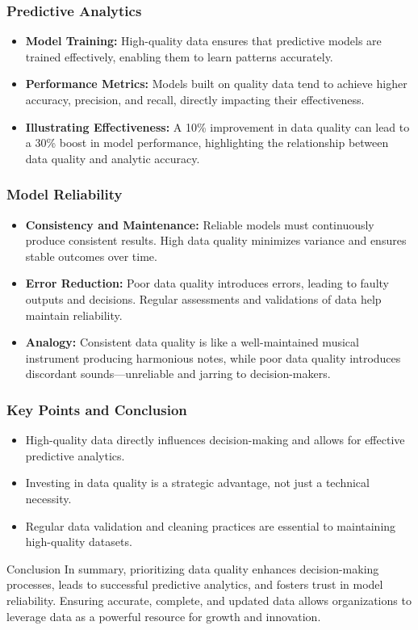 \documentclass[aspectratio=169]{beamer}
\begin{document}
\begin{frame}[fragile]
    \frametitle{Predictive Analytics}
    \begin{itemize}
        \item \textbf{Model Training:} High-quality data ensures that predictive models are trained effectively, enabling them to learn patterns accurately. 
        \item \textbf{Performance Metrics:} Models built on quality data tend to achieve higher accuracy, precision, and recall, directly impacting their effectiveness.
        \item \textbf{Illustrating Effectiveness:} A 10\% improvement in data quality can lead to a 30\% boost in model performance, highlighting the relationship between data quality and analytic accuracy.
    \end{itemize}
\end{frame}

\begin{frame}[fragile]
    \frametitle{Model Reliability}
    \begin{itemize}
        \item \textbf{Consistency and Maintenance:} Reliable models must continuously produce consistent results. High data quality minimizes variance and ensures stable outcomes over time.
        \item \textbf{Error Reduction:} Poor data quality introduces errors, leading to faulty outputs and decisions. Regular assessments and validations of data help maintain reliability.
        \item \textbf{Analogy:} Consistent data quality is like a well-maintained musical instrument producing harmonious notes, while poor data quality introduces discordant sounds—unreliable and jarring to decision-makers.
    \end{itemize}
\end{frame}

\begin{frame}[fragile]
    \frametitle{Key Points and Conclusion}
    \begin{itemize}
        \item High-quality data directly influences decision-making and allows for effective predictive analytics.
        \item Investing in data quality is a strategic advantage, not just a technical necessity.
        \item Regular data validation and cleaning practices are essential to maintaining high-quality datasets.
    \end{itemize}
    \begin{block}{Conclusion}
        In summary, prioritizing data quality enhances decision-making processes, leads to successful predictive analytics, and fosters trust in model reliability. Ensuring accurate, complete, and updated data allows organizations to leverage data as a powerful resource for growth and innovation.
    \end{block}
\end{frame}
\end{document}
